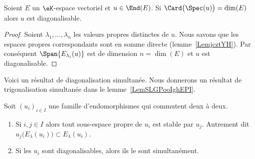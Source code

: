 \begin{lemma}
	Soient \( E\) un \( \eK\)-espace vectoriel et \( u\in\End(E)\). Si \( \Card\big( \Spec(u) \big)=\dim(E)\) alors \( u\) est diagonalisable.
\end{lemma}

\begin{proof}
	Soient \( \lambda_1,\ldots, \lambda_n\) les valeurs propres distinctes de \( u\). Nous savons que les espaces propres correspondants sont en somme directe (lemme~\ref{LemjcztYH}). Par conséquent \( \Span\{ E_{\lambda_i}(u) \}\) est de dimension \( n=\dim(E)\) et \( u\) est diagonalisable.
\end{proof}

Voici un résultat de diagonalisation simultanée. Nous donnerons un résultat de trigonalisation simultanée dans le lemme~\ref{LemSLGPooIghEPI}.
\begin{proposition}     \label{PropGqhAMei}
	Soit \( (u_i)_{i\in I}\) une famille d'endomorphismes qui commutent deux à deux.
	\begin{enumerate}
		\item       \label{ItemGqhAMei}
		      Si \( i,j\in I\) alors tout sous-espace propre de \( u_i\) est stable par \( u_j\). Autrement dit \( u_j\big(E_{\lambda}(u_i)\big)\subset E_{\lambda}(u_i)\).
		\item
		      Si les \( u_i\) sont diagonalisables, alors ils le sont simultanément.
	\end{enumerate}
\end{proposition}

